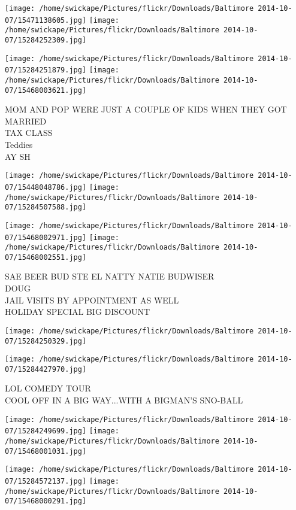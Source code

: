\documentclass[10pt,letterpaper]{article}
\begin{document}
\texttt{[image: /home/swickape/Pictures/flickr/Downloads/Baltimore 2014-10-07/15471138605.jpg]}
\texttt{[image: /home/swickape/Pictures/flickr/Downloads/Baltimore 2014-10-07/15284252309.jpg]}

\texttt{[image: /home/swickape/Pictures/flickr/Downloads/Baltimore 2014-10-07/15284251879.jpg]}
\texttt{[image: /home/swickape/Pictures/flickr/Downloads/Baltimore 2014-10-07/15468003621.jpg]}

MOM AND POP WERE JUST A COUPLE OF KIDS WHEN THEY GOT MARRIED\\
TAX CLASS\\
Teddies\\
AY SH\\
\pagebreak

\texttt{[image: /home/swickape/Pictures/flickr/Downloads/Baltimore 2014-10-07/15448048786.jpg]}
\texttt{[image: /home/swickape/Pictures/flickr/Downloads/Baltimore 2014-10-07/15284507588.jpg]}

\texttt{[image: /home/swickape/Pictures/flickr/Downloads/Baltimore 2014-10-07/15468002971.jpg]}
\texttt{[image: /home/swickape/Pictures/flickr/Downloads/Baltimore 2014-10-07/15468002551.jpg]}

SAE BEER BUD STE EL NATTY NATIE BUDWISER\\
DOUG\\
JAIL VISITS BY APPOINTMENT AS WELL\\
HOLIDAY SPECIAL BIG DISCOUNT\\
\pagebreak

\texttt{[image: /home/swickape/Pictures/flickr/Downloads/Baltimore 2014-10-07/15284250329.jpg]}

\vspace{0.25in}
\texttt{[image: /home/swickape/Pictures/flickr/Downloads/Baltimore 2014-10-07/15284427970.jpg]}

LOL COMEDY TOUR\\
COOL OFF IN A BIG WAY...WITH A BIGMAN'S SNO{-}BALL\\
\pagebreak

\texttt{[image: /home/swickape/Pictures/flickr/Downloads/Baltimore 2014-10-07/15284249699.jpg]}
\texttt{[image: /home/swickape/Pictures/flickr/Downloads/Baltimore 2014-10-07/15468001031.jpg]}

\texttt{[image: /home/swickape/Pictures/flickr/Downloads/Baltimore 2014-10-07/15284572137.jpg]}
\texttt{[image: /home/swickape/Pictures/flickr/Downloads/Baltimore 2014-10-07/15468000291.jpg]}
\end{document}
